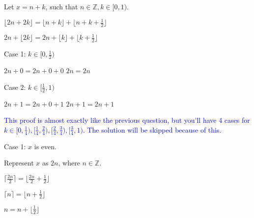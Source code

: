 \documentclass{exam}
\begin{document}
\begin{questions}
\begin{subparts}

\begin{center}

Let \(x = n + k\), such that \(n \in \mathbb{Z}, k \in [0, 1) \).

\( \lfloor 2n + 2k \rfloor = \lfloor n + k \rfloor + \lfloor n + k + \frac{1}{2} \rfloor \)

\( 2n + \lfloor 2k \rfloor = 2n + \lfloor k \rfloor + \lfloor k + \frac{1}{2} \rfloor \)
\vspace{5px}

Case 1: \(k \in [0, \frac{1}{2}) \)

\( 2n + 0 = 2n + 0 + 0 \)
\( 2n = 2n\)
\vspace{5px}

Case 2: \(k \in [\frac{1}{2}, 1) \)

\( 2n + 1 = 2n + 0 + 1 \)
\( 2n + 1 = 2n + 1\)

\end{center}


\begin{center}

\textcolor{blue}{This proof is almost exactly like the previous question, but you'll have 4 cases for \(k \in [0, \frac{1}{4}), [\frac{1}{4}, \frac{2}{4}), [\frac{2}{4}, \frac{3}{4}), [\frac{3}{4}, 1)\). The solution will be skipped because of this.}

\end{center}

\newpage


\begin{center}

Case 1: \(x\) is even.

Represent \(x\) as \(2n\), where \(n \in \mathbb{Z}\).

\( \lceil \frac{2n}{2} \rceil = \lfloor \frac{2n}{2} + \frac{1}{2} \rfloor \)

\( \lceil n \rceil = \lfloor n + \frac{1}{2} \rfloor \)

\( n = n + \lfloor \frac{1}{2} \rfloor \)


\end{center}
\end{subparts}
\end{questions}
\end{document}
